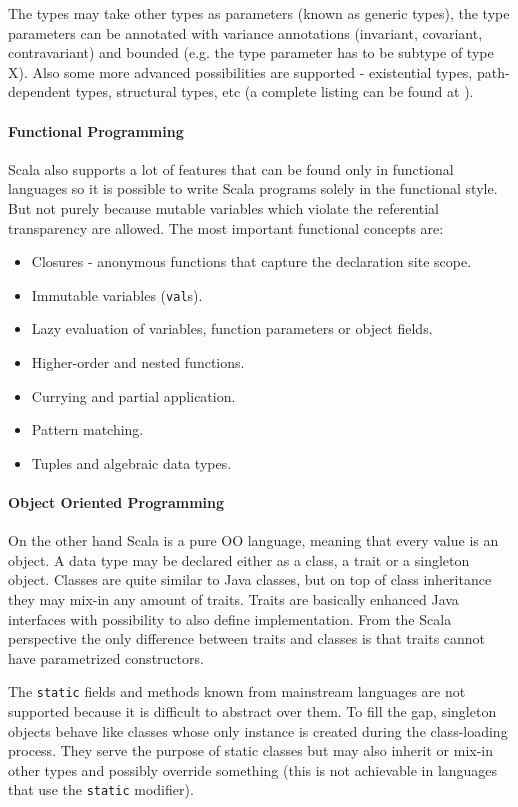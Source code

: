 \documentclass[12pt,a4paper]{report}
\begin{document}
The types may take other types as parameters (known as generic types), the type parameters can be annotated with variance annotations (invariant, covariant, contravariant) and bounded (e.g. the type parameter has to be subtype of type X). Also some more advanced possibilities are supported - existential types, path-dependent types, structural types, etc (a complete listing can be found at \cite{ScalaAdvancedTypes}).

\paragraph{Functional Programming} Scala also supports a lot of features that can be found only in functional languages so it is possible to write Scala programs solely in the functional style. But not purely because mutable variables which violate the referential transparency are allowed. The most important functional concepts are:

\begin{itemize}
\item Closures - anonymous functions that capture the declaration site scope.
\item Immutable variables (\texttt{val}s).
\item Lazy evaluation of variables, function parameters or object fields.
\item Higher-order and nested functions.
\item Currying and partial application.
\item Pattern matching.
\item Tuples and algebraic data types.
\end{itemize}

\paragraph{Object Oriented Programming} On the other hand Scala is a pure OO language, meaning that every value is an object. A data type may be declared either as a class, a trait or a singleton object. Classes are quite similar to Java classes, but on top of class inheritance they may mix-in any amount of traits. Traits are basically enhanced Java interfaces with possibility to also define implementation. From the Scala perspective the only difference between traits and classes is that traits cannot have parametrized constructors.

The \texttt{static} fields and methods known from mainstream languages are not supported because it is difficult to abstract over them. To fill the gap, singleton objects behave like classes whose only instance is created during the class-loading process. They serve the purpose of static classes but may also inherit or mix-in other types and possibly override something (this is not achievable in languages that use the \texttt{static} modifier).
\end{document}
